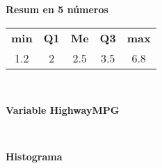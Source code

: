 \begin{center} \bf Resum en 5 n\'umeros \end{center} 
\begin{center}
\begin{tabular}{c c c c c}
{\bf min} & {\bf Q1} & {\bf Me } & {\bf Q3} & {\bf max} \\
1.2 & 2 & 2.5 & 3.5 & 6.8 \\
\end{tabular}
\end{center} \vfill

\vspace{3ex}
\mbox{ } \vfill
\begin{center} \Large \bf Variable HighwayMPG \end{center}

\mbox{ } \vfill
\begin{center}
{\hspace{60pt}\bf Histograma }\vspace{0.5em}


\end{center}
